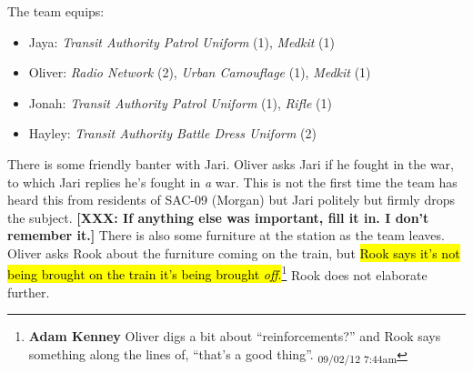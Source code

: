 
The team equips:

\begin{itemize}
\item Jaya:\textit{ Transit Authority Patrol Uniform} (1),  \textit{Medkit} (1)
\item Oliver:\textit{ Radio Network} (2),\textit{ Urban Camouflage} (1),\textit{ Medkit} (1)
\item Jonah:\textit{ Transit Authority Patrol Uniform} (1),\textit{  Rifle} (1)
\item Hayley:\textit{ Transit Authority Battle Dress Uniform} (2)
\end{itemize}



There is some friendly banter with Jari.  Oliver asks Jari if he fought in the war, to which Jari replies he's fought in\textit{ a} war.  This is not the first time the team has heard this from residents of SAC-09 (Morgan) but Jari politely but firmly drops the subject.  \textbf{{[}XXX: If anything else was important, fill it in.  I don't remember it.{]}}  There is also some furniture at the station as the team leaves.  Oliver asks Rook about the furniture coming on the train, but \hl{Rook says it's not being brought on the train it's being brought\textit{ off}.}\footnote{\textbf{Adam Kenney }Oliver digs a bit about ``reinforcements?'' and Rook says something along the lines of, ``that's a good thing''. \textsubscript{09/02/12 7:44am}}  Rook does not elaborate further.






